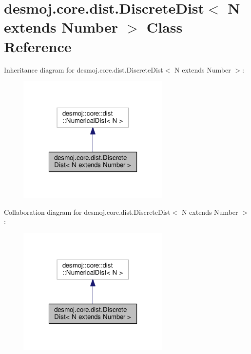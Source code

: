 \section{desmoj.\-core.\-dist.\-Discrete\-Dist$<$ N extends Number $>$ Class Reference}
\label{classdesmoj_1_1core_1_1dist_1_1_discrete_dist_3_01_n_01extends_01_number_01_4}


Inheritance diagram for desmoj.\-core.\-dist.\-Discrete\-Dist$<$ N extends Number $>$\-:
\nopagebreak
\begin{figure}[H]
\begin{center}
\leavevmode
\includegraphics[width=214pt]{classdesmoj_1_1core_1_1dist_1_1_discrete_dist_3_01_n_01extends_01_number_01_4__inherit__graph}
\end{center}
\end{figure}


Collaboration diagram for desmoj.\-core.\-dist.\-Discrete\-Dist$<$ N extends Number $>$\-:
\nopagebreak
\begin{figure}[H]
\begin{center}
\leavevmode
\includegraphics[width=214pt]{classdesmoj_1_1core_1_1dist_1_1_discrete_dist_3_01_n_01extends_01_number_01_4__coll__graph}
\end{center}
\end{figure}
